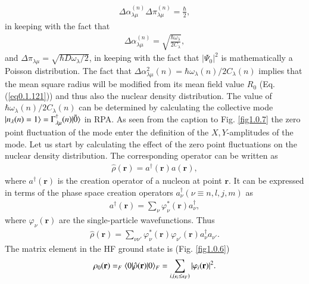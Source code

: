 \begin{align}\label{eq0.1.121}
\Delta\alpha_{\lambda\mu}^{(n)}\Delta\pi_{\lambda\mu}^{(n)}=\frac{\hbar}{2},
\end{align}
in keeping with the fact that
\begin{align}\label{eq1.8.2}
\Delta\alpha_{\lambda\mu}^{(n)}=\sqrt{\frac{\hbar\omega_\lambda}{2C_\lambda}},
\end{align}
and $\Delta\pi_{\lambda\mu}=\sqrt{\hbar D\omega_\lambda/2}$,  in keeping with the fact that $|\Psi_0|^2$ is mathematically a Poisson distribution. The fact that $\Delta\alpha^2_{\lambda\mu}(n)=\hbar\omega_\lambda(n)/2C_\lambda(n)$ implies that the mean square radius will be modified from its mean field value $R_0$ (Eq. (\ref{eq0.1.121})) and thus also the nuclear density distribution. The value of $\hbar\omega_\lambda(n)/2C_\lambda(n)$ can be determined by calculating the collective mode $|{n_\lambda(n)=1} \rangle=\Gamma_{\lambda\mu}^\dagger(n)|{\tilde 0} \rangle$ in RPA. As seen from the caption to Fig. \ref{fig1.0.7} the zero point fluctuation of the mode enter the definition of the $X,Y$-amplitudes of the mode. Let us start by calculating the effect of the zero point fluctuations on the nuclear density distribution. The corresponding operator can be written as
\begin{align}\label{eq0.1.123}
\hat\rho(\mathbf r)=a^\dagger(\mathbf r)a(\mathbf r),
\end{align}
where $a^\dagger(\mathbf r)$ is the creation operator of a nucleon at point $\mathbf r$. It can be expressed in terms of the phase space creation operators $a^\dagger_\nu(\nu\equiv n,l,j,m)$ as
\begin{align}\label{eq0.1.124}
a^\dagger(\mathbf r)=\sum_\nu\varphi^*_\nu(\mathbf r) a^\dagger_\nu,
\end{align}
where $\varphi_\nu(\mathbf r)$ are the single-particle wavefunctions. Thus
\begin{align}\label{eq0.1.125}
\hat\rho(\mathbf r)=\sum_{\nu\nu'}\varphi^*_\nu(\mathbf r)\varphi_{\nu'}(\mathbf r)a^\dagger_\nu a_{\nu'}.
\end{align}
The matrix element in the HF ground state is (Fig. \ref{fig1.0.6})
\begin{align}\label{eq0.1.126}
\rho_0(\mathbf r)=_F\langle {0|\hat\rho(\mathbf r)|0} \rangle_F=\sum_{i, (\epsilon_i\leq\epsilon_F)}|\varphi_i(\mathbf r)|^2.
\end{align}
